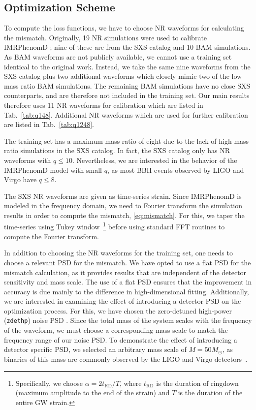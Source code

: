 \documentclass[twocolumn]{aastex631}
\newcommand{\zdethp}{\texttt{zdethp}}
\newcommand{\te}[1]{{\color{rr}[TE: #1 ]}}
\begin{document}
\subsection{Optimization Scheme} \label{subsec:optimization}

To compute the loss functions, we have to choose NR waveforms for calculating the mismatch.
Originally, 19 NR simulations were used to calibrate IMRPhenomD \citep{khan2016frequency}; nine of these 
are from the SXS catalog \citep{boyle2019sxs} and 10 BAM simulations. 
As BAM waveforms are not publicly available, we cannot use a training set identical to the original work.
Instead, we take the same nine waveforms from the SXS catalog plus two additional waveforms which closely mimic
two of the low mass ratio BAM simulations. 
The remaining BAM simulations have no close SXS counterparts, and are therefore not included in the training set.
Our main results therefore uses 11 NR waveforms for calibration which are listed in Tab.~\ref{tab:q148}.
Additional NR waveforms which are used for further calibration are listed in Tab.~\ref{tab:q1248}.  

The training set has a maximum mass ratio of eight due to the lack 
of high mass ratio simulations in the SXS catalog.
In fact, the SXS catalog only has NR waveforms with $q\leq10$.
Nevertheless, we are interested in the behavior of the IMRPhenomD model with small $q$,
as most BBH events observed by LIGO and Virgo have $q\leq8$.

The SXS NR waveforms are given as time-series strain.
Since IMRPhenomD is modeled in the frequency domain, we need to Fourier transform the simulation results
in order to compute the mismatch, \eqref{eq:mismatch}.
For this, we taper the time-series using Tukey window~\citep{usman2016pycbc}\footnote{
	Specifically, we choose $\alpha=2t_{\mathrm{RD}}/T$, where
	$t_{\mathrm{RD}}$ is the duration of ringdown (maximum amplitude to the end of the strain) and $T$ is the duration of the
	entire GW strain. 
} before using standard FFT routines to compute the Fourier transform.

In addition to choosing the NR waveforms for the training set,
one needs to choose a relevant PSD for the mismatch.
We have opted to use a flat PSD for the mismatch calculation,
as it provides results that are independent of the detector sensitivity and mass scale.
The use of a flat PSD ensures that the improvement in accuracy is due mainly
to the difference in high-dimensional fitting.
Additionally, we are interested in examining the effect of introducing a detector PSD
on the optimization process. For this, we have chosen the
zero-detuned high-power (\zdethp) noise PSD \citep{aasi2015advanced}.
Since the total mass of the system scales with the frequency of the waveform,
we must choose a corresponding mass scale to match the frequency range of our noise PSD.
To demonstrate the effect of introducing a detector specific PSD,
we selected an arbitrary mass scale of $M=50M_{\odot}$, as binaries
of this mass are commonly observed by the LIGO and Virgo detectors~\citep{gwtc1, gwtc2, gwtc21, gwtc3}.
\end{document}
